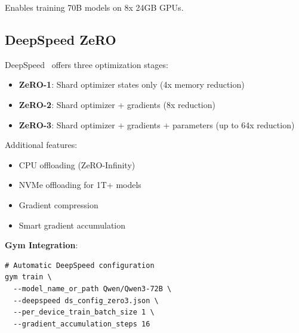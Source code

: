 Enables training 70B models on 8x 24GB GPUs.

\subsection{DeepSpeed ZeRO}

DeepSpeed~\citep{rasley2020deepspeed} offers three optimization stages:

\begin{itemize}
\item \textbf{ZeRO-1}: Shard optimizer states only (4x memory reduction)
\item \textbf{ZeRO-2}: Shard optimizer + gradients (8x reduction)
\item \textbf{ZeRO-3}: Shard optimizer + gradients + parameters (up to 64x reduction)
\end{itemize}

Additional features:
\begin{itemize}
\item CPU offloading (ZeRO-Infinity)
\item NVMe offloading for 1T+ models
\item Gradient compression
\item Smart gradient accumulation
\end{itemize}

\textbf{Gym Integration}:
\begin{verbatim}
# Automatic DeepSpeed configuration
gym train \
  --model_name_or_path Qwen/Qwen3-72B \
  --deepspeed ds_config_zero3.json \
  --per_device_train_batch_size 1 \
  --gradient_accumulation_steps 16
\end{verbatim}

